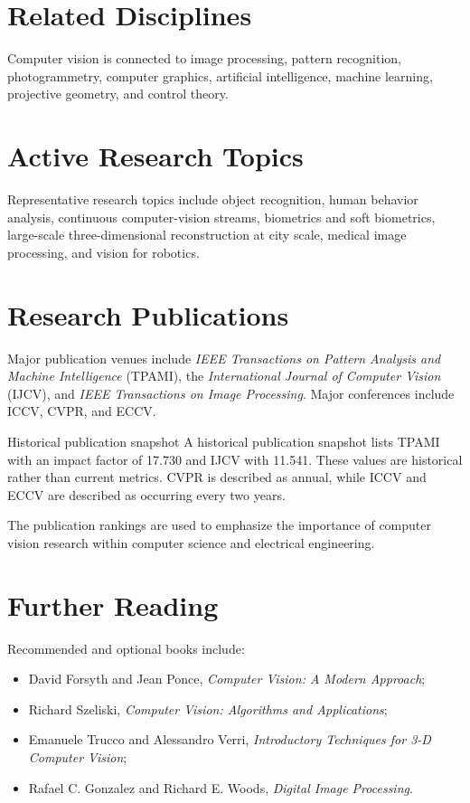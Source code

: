 \documentclass[11pt,a4paper,oneside]{report}
\begin{document}
\section{Related Disciplines}

Computer vision is connected to image processing, pattern recognition, photogrammetry, computer graphics, artificial intelligence, machine learning, projective geometry, and control theory.

\section{Active Research Topics}

Representative research topics include object recognition, human behavior analysis, continuous computer-vision streams, biometrics and soft biometrics, large-scale three-dimensional reconstruction at city scale, medical image processing, and vision for robotics.

\section{Research Publications}

Major publication venues include \emph{IEEE Transactions on Pattern Analysis and Machine Intelligence} (TPAMI), the \emph{International Journal of Computer Vision} (IJCV), and \emph{IEEE Transactions on Image Processing}. Major conferences include ICCV, CVPR, and ECCV.

\begin{remarkbox}{Historical publication snapshot}
A historical publication snapshot lists TPAMI with an impact factor of 17.730 and IJCV with 11.541. These values are historical rather than current metrics. CVPR is described as annual, while ICCV and ECCV are described as occurring every two years.
\end{remarkbox}

The publication rankings are used to emphasize the importance of computer vision research within computer science and electrical engineering.

\section{Further Reading}

Recommended and optional books include:

\begin{itemize}
  \item David Forsyth and Jean Ponce, \emph{Computer Vision: A Modern Approach};
  \item Richard Szeliski, \emph{Computer Vision: Algorithms and Applications};
  \item Emanuele Trucco and Alessandro Verri, \emph{Introductory Techniques for 3-D Computer Vision};
  \item Rafael C. Gonzalez and Richard E. Woods, \emph{Digital Image Processing}.
\end{itemize}
\end{document}
